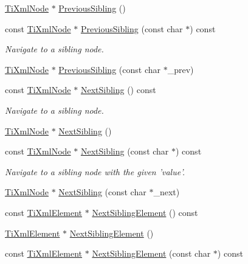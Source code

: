 \begin{DoxyCompactItemize}
\hyperlink{class_ti_xml_node}{Ti\+Xml\+Node} $\ast$ \hyperlink{class_ti_xml_node_af8c0642ad6ecc03f62953e68896ed1cc}{Previous\+Sibling} ()
\item 
const \hyperlink{class_ti_xml_node}{Ti\+Xml\+Node} $\ast$ \hyperlink{class_ti_xml_node_abbb3b8c1f38fa7b9e52d584a4aeca795}{Previous\+Sibling} (const char $\ast$) const 
\begin{DoxyCompactList}\small\item\em Navigate to a sibling node. \end{DoxyCompactList}\item 
\hyperlink{class_ti_xml_node}{Ti\+Xml\+Node} $\ast$ \hyperlink{class_ti_xml_node_a6c977049207177ef21b51972315c2053}{Previous\+Sibling} (const char $\ast$\+\_\+prev)
\item 
const \hyperlink{class_ti_xml_node}{Ti\+Xml\+Node} $\ast$ \hyperlink{class_ti_xml_node_af854baeba384f5fe9859f5aee03b548e}{Next\+Sibling} () const 
\begin{DoxyCompactList}\small\item\em Navigate to a sibling node. \end{DoxyCompactList}\item 
\hyperlink{class_ti_xml_node}{Ti\+Xml\+Node} $\ast$ \hyperlink{class_ti_xml_node_a4d05f7b1d7b470ac6887edd072d4892a}{Next\+Sibling} ()
\item 
const \hyperlink{class_ti_xml_node}{Ti\+Xml\+Node} $\ast$ \hyperlink{class_ti_xml_node_acaf9dc17531ac041f602f9ad579573ea}{Next\+Sibling} (const char $\ast$) const 
\begin{DoxyCompactList}\small\item\em Navigate to a sibling node with the given 'value'. \end{DoxyCompactList}\item 
\hyperlink{class_ti_xml_node}{Ti\+Xml\+Node} $\ast$ \hyperlink{class_ti_xml_node_a4080bc5cc8a5c139e7cf308669e850fc}{Next\+Sibling} (const char $\ast$\+\_\+next)
\item 
const \hyperlink{class_ti_xml_element}{Ti\+Xml\+Element} $\ast$ \hyperlink{class_ti_xml_node_a7667217e269e0da01d1f82aee94d1a3d}{Next\+Sibling\+Element} () const 
\item 
\hyperlink{class_ti_xml_element}{Ti\+Xml\+Element} $\ast$ \hyperlink{class_ti_xml_node_a1b211cb5034655a04358e0e2f6fc5010}{Next\+Sibling\+Element} ()
\item 
const \hyperlink{class_ti_xml_element}{Ti\+Xml\+Element} $\ast$ \hyperlink{class_ti_xml_node_a3d7897999f99cf4870dd59df6331d7ff}{Next\+Sibling\+Element} (const char $\ast$) const 

\end{DoxyCompactItemize}
